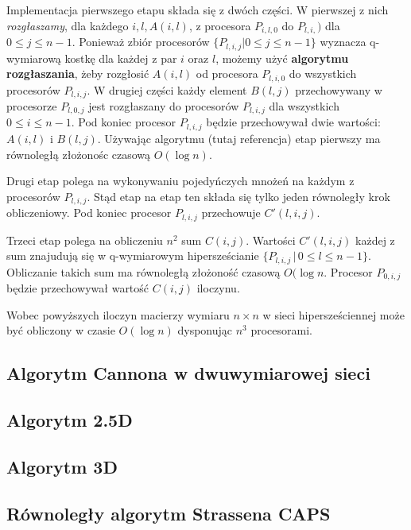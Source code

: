 Implementacja pierwszego etapu składa się z dwóch części. W pierwszej z nich \emph{rozgłaszamy}, dla każdego \(i, l, A(i,l)\), z procesora \(P_{i,l,0}\) do \(P_{l,i,})\) dla \(0\leq j \leq n-1\). Ponieważ zbiór procesorów \(\{P_{l,i,j}|0\leq j \leq n-1\}\) wyznacza q-wymiarową kostkę dla każdej z par \(i\) oraz \(l\), możemy użyć \textbf{algorytmu rozgłaszania}, żeby rozgłosić \(A(i,l)\) od procesora \(P_{l,i,0}\) do wszystkich procesorów \(P_{l,i,j}\).
W drugiej części każdy element \(B(l,j)\) przechowywany w procesorze \(P_{l,0,j}\) jest rozgłaszany do procesorów \(P_{l,i,j}\) dla wszystkich \(0\leq i \leq n-1\). Pod koniec procesor \(P_{l,i,j}\) będzie przechowywał dwie wartości: \(A(i,l)\) i \(B(l,j)\). Używając algorytmu (tutaj referencja) etap pierwszy ma równoległą złożonośc czasową \(O(\log{n})\).

Drugi etap polega na wykonywaniu pojedyńczych mnożeń na każdym z procesorów \(P_{l,i,j}\). Stąd etap na etap ten składa się tylko jeden równoległy krok obliczeniowy. Pod koniec procesor \(P_{l,i,j}\) przechowuje \(C'(l,i,j)\).

Trzeci etap polega na obliczeniu \(n^2\) sum \(C(i,j)\). Wartości \(C'(l,i,j)\) każdej z sum znajudują się w q-wymiarowym hipersześcianie \(\{P_{l,i,j}\,|\,0\leq l\leq n-1\}\). Obliczanie takich sum ma równoległą złożoność czasową \(O(\log{n}\). Procesor \(P_{0,i,j}\) będzie przechowywał wartość \(C(i,j)\) iloczynu.

Wobec powyższych iloczyn macierzy wymiaru \(n \times n\) w sieci hipersześciennej może być obliczony w czasie \(O(\log{n})\) dysponując \(n^3\) procesorami.
\subsection{Algorytm Cannona w dwuwymiarowej sieci}
\cite{communication_efficient}
\subsection{Algorytm 2.5D}
\cite{Solomonik:EECS-2011-72}
\subsection{Algorytm 3D}
\cite{communication_efficient}
\subsection{Równoległy algorytm Strassena CAPS}
\cite{DBLP:journals/corr/abs-1202-3173}